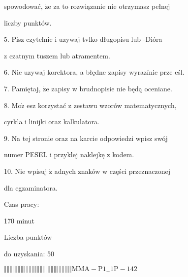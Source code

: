 \documentclass[a4paper,12pt]{article}
\begin{document}
spowodować, $\dot{\mathrm{z}}\mathrm{e}$ za to rozwiązanie nie otrzymasz pełnej

liczby punktów.

5. Pisz czytelnie i uzywaj tvlko długopisu lub -Dióra

z czatnym tuszem lub atramentem.

6. Nie uzywaj korektora, a błędne zapisy wyrazínie prze eśl.

7. Pamiętaj, $\dot{\mathrm{z}}\mathrm{e}$ zapisy w brudnopisie nie będą oceniane.

8. $\mathrm{M}\mathrm{o}\dot{\mathrm{z}}$ esz korzystać z zestawu wzorów matematycznych,

cyrkla i linijki oraz kalkulatora.

9. Na tej stronie oraz na karcie odpowiedzi wpisz swój

numer PESEL i przyklej naklejkę z kodem.

10. Nie wpisuj $\dot{\mathrm{z}}$ adnych znaków w części przeznaczonej

dla egzaminatora.

Czas pracy:

170 minut

Liczba punktów

do uzyskania: 50

$\Vert\Vert\Vert\Vert\Vert\Vert\Vert\Vert\Vert\Vert\Vert\Vert\Vert\Vert\Vert\Vert\Vert\Vert\Vert\Vert\Vert\Vert\Vert\Vert|  \mathrm{M}\mathrm{M}\mathrm{A}-\mathrm{P}1_{-}1\mathrm{P}-142$
\end{document}
